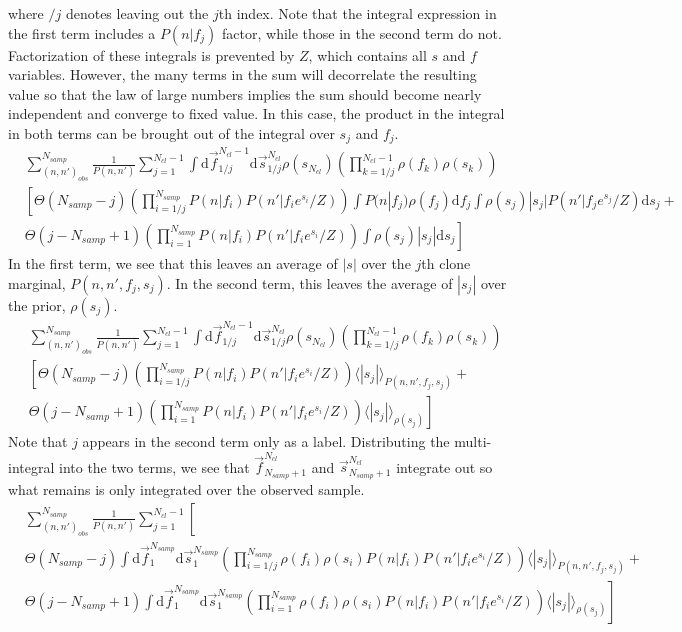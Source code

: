 \documentclass[letterpaper,english,prl,reprint,onecolumn]{revtex4-1} %
\begin{document}
where $/j$ denotes leaving out the $j$th index. Note that the integral expression in the first term includes a $P(n|f_j)$ factor, while those in the second term do not. Factorization of these integrals is prevented by $Z$, which contains all $s$ and $f$ variables. However, the many terms in the sum will decorrelate the resulting value so that the law of large numbers implies the sum should become nearly independent and converge to fixed value. In this case, the product in the integral in both terms can be brought out of the integral over $s_j$ and $f_j$. 
\begin{align}
	&\sum_{(n,n')_{obs}}^{N_{samp}}\frac{1}{P(n,n')}\sum_{j=1}^{N_{cl}-1}\int\mathrm{d}\vec{f}_{1/j}^{N_{cl}-1}\mathrm{d}\vec{s}_{1/j}^{N_{cl}}\rho(s_{N_{cl}})\left(\prod_{k=1/j}^{N_{cl}-1}\rho(f_k)\rho(s_k)\right)\\
	&\left[\Theta(N_{samp}-j)\left(\prod_{i=1/j}^{N_{samp}}P(n|f_i)P(n'|f_ie^{s_i}/Z)\right)\right.
		\int P(n|f_j)\rho(f_j)\mathrm{d}f_j\int \rho(s_j)|s_j|P(n'|f_je^{s_j}/Z)\mathrm{d}s_j 
	 +\\
	&\left. \Theta(j-N_{samp}+1)\left(\prod_{i=1}^{N_{samp}}P(n|f_i)P(n'|f_ie^{s_i}/Z)\right) \int \rho(s_j)|s_j|\mathrm{d}s_j\right]
\end{align}
In the first term, we see that this leaves an average of $|s|$ over the $j$th clone marginal, $P(n,n',f_j,s_j)$. In the second term, this leaves the average of $|s_j|$ over the prior, $\rho(s_j)$.
\begin{align}
	&\sum_{(n,n')_{obs}}^{N_{samp}}\frac{1}{P(n,n')}\sum_{j=1}^{N_{cl}-1}\int\mathrm{d}\vec{f}_{1/j}^{N_{cl}-1}\mathrm{d}\vec{s}_{1/j}^{N_{cl}}\rho(s_{N_{cl}})\left(\prod_{k=1/j}^{N_{cl}-1}\rho(f_k)\rho(s_k)\right)\\
	&\left[\Theta(N_{samp}-j)\left(\prod_{i=1/j}^{N_{samp}}P(n|f_i)P(n'|f_ie^{s_i}/Z)\right)\right.
		\langle|s_j|\rangle_{P(n,n',f_j,s_j)} 
	 +\\
	&\left. \Theta(j-N_{samp}+1)\left(\prod_{i=1}^{N_{samp}}P(n|f_i)P(n'|f_ie^{s_i}/Z)\right) \langle|s_j|\rangle_{\rho(s_j)}\right]
\end{align}
Note that $j$ appears in the second term only as a label. Distributing the multi-integral into the two terms, we see that $\vec{f}_{N_{samp}+1}^{N_{cl}}$ and $\vec{s}_{N_{samp}+1}^{N_{cl}}$ integrate out so what remains is only integrated over the observed sample. 
\begin{align}
	&\sum_{(n,n')_{obs}}^{N_{samp}}\frac{1}{P(n,n')}\sum_{j=1}^{N_{cl}-1}\left[\right.\\
	&\Theta(N_{samp}-j)\int\mathrm{d}\vec{f}_{1}^{N_{samp}}\mathrm{d}\vec{s}_{1}^{N_{samp}}\left(\prod_{i=1/j}^{N_{samp}}\rho(f_i)\rho(s_i)P(n|f_i)P(n'|f_ie^{s_i}/Z)\right)
		\langle|s_j|\rangle_{P(n,n',f_j,s_j)}
	 +\\
	&\left. \Theta(j-N_{samp}+1)\int\mathrm{d}\vec{f}_{1}^{N_{samp}}\mathrm{d}\vec{s}_{1}^{N_{samp}}\left(\prod_{i=1}^{N_{samp}}\rho(f_i)\rho(s_i)P(n|f_i)P(n'|f_ie^{s_i}/Z)\right) \langle|s_j|\rangle_{\rho(s_j)}\right]
\end{align}
\end{document}
